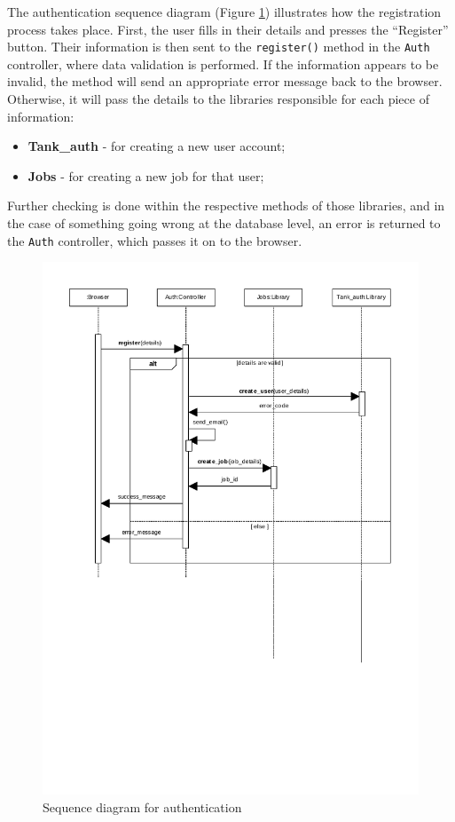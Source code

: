 \documentclass{l3proj}
\begin{document}
The authentication sequence diagram (Figure \ref{fig:seq-authetication})
illustrates how the registration process takes place. First, the user fills in
their details and presses the ``Register'' button. Their information is then
sent to the \texttt{register()} method in the \texttt{Auth} controller,
where data validation is performed. If the information appears to be invalid,
the method will send an appropriate error message back to the browser. 
Otherwise, it will pass the details to the libraries responsible for each
piece of information:
\begin{itemize} \itemsep1pt \parskip0pt 
	\item \textbf{Tank\_auth} - for creating a new user account;
	\item \textbf{Jobs} - for creating a new job for that user;
\end{itemize}
Further checking is done within the respective methods of those libraries, and
in the case of something going wrong at the database level, an error is returned
to the \texttt{Auth} controller, which passes it on to the browser.

\begin{figure}[h]
	\label{fig:seq-authetication}
	\centering
	\includegraphics[width=0.9\linewidth, trim=0px 250px 0px 0px, clip=true]
		{figures/seq-authentication}
	\caption{Sequence diagram for authentication}
\end{figure}
\end{document}
